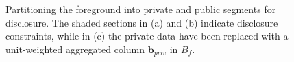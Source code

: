 \begin{figure}[t]
  \begin{center}
    
    \caption{Partitioning the foreground into private and public segments for disclosure.  The shaded sections in (a) and (b) indicate disclosure constraints, while in (c) the private data have been replaced with a unit-weighted aggregated column $\mathbf{b}_{priv}$ in $B_f$.}
    \label{fig:private}
  \end{center}
\end{figure}
